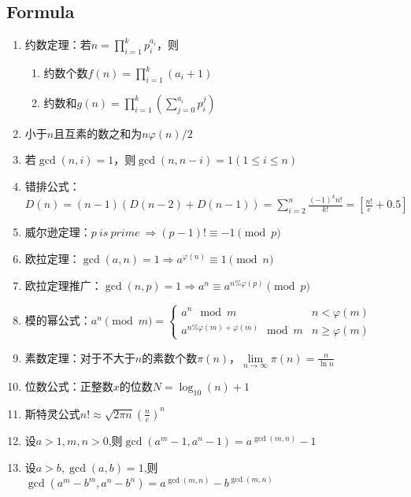 \documentclass[twoside]{article}
\begin{document}
\subsection{Formula}
\begin{enumerate}
\item 约数定理：若$n=\prod_{i=1}^kp_i^{a_i}$，则

\begin{enumerate}
\item 约数个数$f(n)=\prod_{i=1}^k(a_i+1)$
\item 约数和$g(n)=\prod_{i=1}^k(\sum_{j=0}^{a_i}p_i^j)$
\end{enumerate}

\item 小于$n$且互素的数之和为$n\varphi(n)/2$

\item 若$\gcd(n,i)=1$，则$\gcd(n,n-i)=1(1\leq i\leq n)$

\item 错排公式：$D(n)=(n-1)(D(n-2)+D(n-1))=\sum_{i=2}^n\frac{(-1)^kn!}{k!}=[\frac{n!}{e}+0.5]$

\item 威尔逊定理：$p\ is\ prime\ \Rightarrow (p-1)!\equiv-1\pmod p$

\item 欧拉定理：$\gcd(a,n)=1\Rightarrow a^{\varphi(n)}\equiv1\pmod n$

\item 欧拉定理推广：$\gcd(n,p)=1\Rightarrow a^n\equiv a^{n\%\varphi(p)}\pmod p$

\item 模的幂公式：$a ^ n \pmod {m} = 
\begin{cases}
a ^ n \mod m & n < \varphi(m)\\
a ^ {n \% \varphi(m) + \varphi(m)} \mod m & n \ge \varphi(m)
\end{cases}
$

\item 素数定理：对于不大于$n$的素数个数$\pi(n)$，$\lim\limits_{n\to\infty}\pi(n)=\frac{n}{\ln n}$

\item 位数公式：正整数$x$的位数$N=\log_{10}(n)+1$

\item 斯特灵公式$n!\approx\sqrt{2\pi n}(\frac{n}{e})^n$

\item 设$a>1,m,n>0$,则$\gcd(a^m-1,a^n-1)=a^{\gcd(m,n)}-1$

\item 设$a>b,\gcd(a,b)=1$,则$\gcd(a^m-b^m,a^n-b^n)=a^{\gcd(m,n)}-b^{\gcd(m,n)}$


\end{enumerate}
\end{document}
